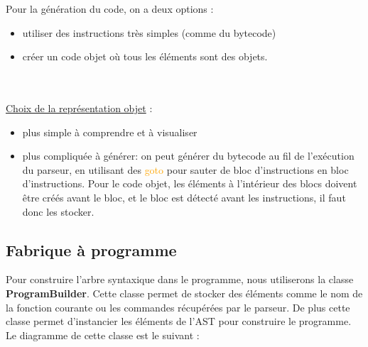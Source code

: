 \documentclass[a4paper]{article}%
\begin{document}
Pour la génération du code, on a deux options :
\begin{itemize}
  \item utiliser des instructions très simples (comme du bytecode)
\item créer un code objet où tous les éléments sont des objets.
\end{itemize}\leavevmode\\~\\

\underline{Choix de la représentation objet} :
\begin{itemize}
\item plus simple à comprendre et à visualiser
\item plus compliquée à générer: on peut générer du bytecode au fil de
  l'exécution du parseur, en utilisant des \textcolor{orange}{goto} pour
    sauter de bloc d'instructions en bloc d'instructions. Pour le code objet,
    les éléments à l'intérieur des blocs doivent être créés avant le bloc, et
    le bloc est détecté avant les instructions, il faut donc les stocker.
\end{itemize}


\clearpage{}

\subsection{Fabrique à programme}\label{sec:fabprog}

Pour construire l'arbre syntaxique dans le programme, nous utiliserons
la classe \textbf{ProgramBuilder}. Cette classe permet de stocker des éléments
comme le nom de la fonction courante ou les commandes récupérées par le
parseur.
De plus cette classe permet d'instancier les éléments de l'AST pour construire
le programme. Le diagramme de cette classe est le suivant :
\end{document}
